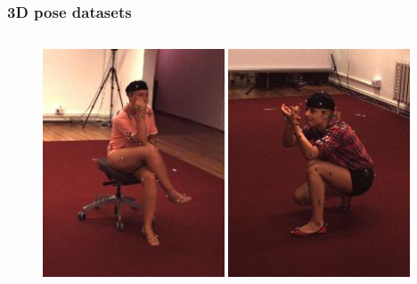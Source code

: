 \documentclass[9pt]{beamer}
\providecommand{\fcite}[1]{\footcite{#1}}
\newenvironment{myframe}[1][]{%
\begin{frame}%
\frametitle{#1}
\setcounter{footnote}{0}


}{%
\end{frame}%
}
\begin{document}
\begin{myframe}[3D pose datasets]
\begin{columns}[T]
\begin{column}{.48\textwidth}
\begin{figure}
              \includegraphics[width=0.48\textwidth]{human-03.jpg}
              \includegraphics[width=0.48\textwidth]{human-04.jpg}
          \end{figure}
      \end{column}
  \end{columns}
\end{myframe}

\end{document}
